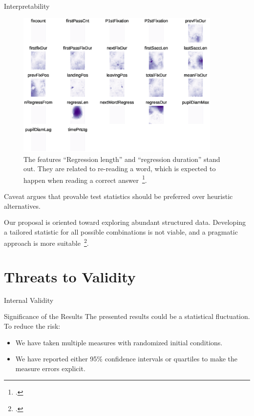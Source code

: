\documentclass[10pt]{beamer}
\begin{document}
\begin{frame}{Interpretability}
    \begin{figure}
        \centering
        \includegraphics[trim=5pt 75pt 5pt 5pt,clip,width=0.9\textwidth]{eye_features.eps}
        \caption{
            The features ``Regression length'' and ``regression duration'' stand out.
            They are related to re-reading a word, which is expected to happen when reading a correct answer~\footcite{salojarvi2005inferring}.
        }
    \end{figure}

\end{frame}


\begin{frame}{Caveat}
    \cite{rosenblatt2019better} argues that provable test statistics
    should be preferred over heuristic alternatives.
        
    Our proposal is oriented toward exploring abundant structured data.
    Developing a tailored statistic for all possible combinations is not viable,
    and a pragmatic approach is more suitable~\footcite{kim2021classification}.

\end{frame}

\section{Threats to Validity}

\begin{frame}{Internal Validity}
    \begin{alertblock}{Significance of the Results}
        \smallskip
        The presented results could be a statistical fluctuation. To reduce the risk:
        
        \begin{itemize}
            \item We have taken multiple measures with randomized initial conditions.
            \item We have reported either 95\% confidence intervals or quartiles to make the measure errors explicit.
        \end{itemize}
    \end{alertblock}
\end{frame}
\end{document}

